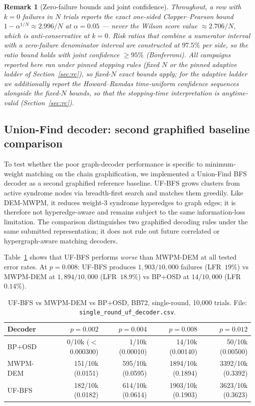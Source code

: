 \documentclass[11pt,a4paper]{article}
\newtheorem{remark}{Remark}
\begin{document}
\begin{remark}[Zero-failure bounds and joint confidence]\label{rem:zerofail}
Throughout, a row with $k{=}0$ failures in $N$ trials reports the exact
one-sided Clopper--Pearson bound $1-\alpha^{1/N}\approx 2.996/N$ at
$\alpha{=}0.05$ --- never the Wilson score value $\approx 2.706/N$,
which is anti-conservative at $k{=}0$. Risk ratios that combine a
numerator interval with a zero-failure denominator interval are
constructed at $97.5\%$ per side, so the ratio bound holds with joint
confidence $\ge95\%$ (Bonferroni). All campaigns reported here ran
under pinned stopping rules (fixed $N$ or the pinned
adaptive ladder of Section~\ref{sec:rc}), so fixed-$N$ exact bounds
apply; for the adaptive ladder we additionally report the
Howard--Ramdas time-uniform confidence sequences
\cite{howard2021confidence} alongside the fixed-$N$ bounds, so that the
stopping-time interpretation is anytime-valid
(Section~\ref{sec:rc}).
\end{remark}

\subsection{Union-Find decoder: second graphified baseline comparison}
\label{ssec:uf}

To test whether the poor graph-decoder performance is specific to minimum-weight
matching on the chain graphification, we implemented a Union-Find BFS decoder
as a second graphified reference baseline.
UF-BFS grows clusters from active syndrome nodes via breadth-first search and
matches them greedily.
Like DEM-MWPM, it reduces weight-3 syndrome hyperedges to graph edges; it is
therefore not hyperedge-aware and remains subject to the same information-loss
limitation.
The comparison distinguishes two graphified decoding rules under the same
submitted representation; it does not rule out future correlated or hypergraph-aware
matching decoders.

Table~\ref{tab:uf} shows that UF-BFS performs \emph{worse} than MWPM-DEM
at all tested error rates.
At $p=0.008$: UF-BFS produces $1{,}903/10{,}000$ failures (LFR~$19\%$)
vs MWPM-DEM at $1{,}894/10{,}000$ (LFR~$18.9\%$) vs BP+OSD at $14/10{,}000$
(LFR~$0.14\%$).

\begin{table}[H]\centering\small
\caption{UF-BFS vs MWPM-DEM vs BP+OSD, BB72, single-round, 10{,}000 trials.
  File: \texttt{single\_round\_uf\_decoder.csv}.}
\label{tab:uf}
\begin{tabular}{@{}lrrrr@{}}
\toprule
Decoder & $p=0.002$ & $p=0.004$ & $p=0.008$ & $p=0.012$ \\
\midrule
BP+OSD   & 0/10k ($<$0.000300) & 1/10k (0.00010) & 14/10k (0.00140) & 50/10k (0.00500) \\
MWPM-DEM & 151/10k (0.0151) & 595/10k (0.0595) & 1894/10k (0.1894) & 3392/10k (0.3392) \\
UF-BFS   & 182/10k (0.0182) & 614/10k (0.0614) & 1903/10k (0.1903) & 3623/10k (0.3623) \\
\bottomrule
\end{tabular}
\end{table}
\end{document}
